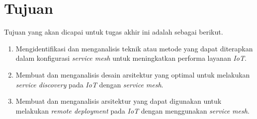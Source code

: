 \section{Tujuan}

Tujuan yang akan dicapai untuk tugas akhir ini adalah sebagai berikut.

\begin{enumerate}
  \item Mengidentifikasi dan menganalisis teknik atau metode yang dapat diterapkan dalam konfigurasi \textit{service mesh} untuk meningkatkan performa layanan \textit{IoT}.
  \item Membuat dan menganalisis desain arsitektur yang optimal untuk melakukan \textit{service discovery} pada \textit{IoT} dengan \textit{service mesh}.
  \item Membuat dan menganalisis arsitektur yang dapat digunakan untuk melakukan \textit{remote deployment} pada \textit{IoT} dengan menggunakan \textit{service mesh}.
\end{enumerate}